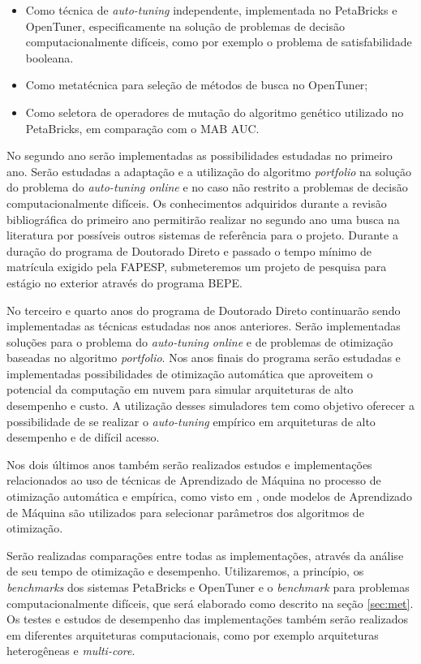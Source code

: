 \documentclass[a4paper, 12pt]{article}
\begin{document}
\begin{itemize}
    \item Como técnica de \emph{auto-tuning} independente, implementada
        no PetaBricks e OpenTuner, especificamente na solução de problemas
        de decisão computacionalmente difíceis, como por exemplo o problema
        de satisfabilidade booleana.
    \item Como metatécnica para seleção de métodos de busca no OpenTuner;
    \item Como seletora de operadores de mutação do algoritmo genético
        utilizado no PetaBricks, em comparação com o MAB AUC.
\end{itemize}

No segundo ano serão implementadas as possibilidades estudadas no primeiro ano.
Serão estudadas a adaptação e a utilização do algoritmo \emph{portfolio} na
solução do problema do \emph{auto-tuning online} e no caso não restrito a
problemas de decisão computacionalmente difíceis. Os conhecimentos adquiridos
durante a revisão bibliográfica do primeiro ano permitirão realizar no segundo
ano uma busca na literatura por possíveis outros sistemas de referência para o
projeto. Durante a duração do programa de Doutorado Direto e passado o tempo
mínimo de matrícula exigido pela FAPESP, submeteremos um projeto de pesquisa
para estágio no exterior através do programa BEPE.

No terceiro e quarto anos do programa de Doutorado Direto continuarão sendo
implementadas as técnicas estudadas nos anos anteriores. Serão implementadas
soluções para o problema do \emph{auto-tuning online} e de problemas de
otimização baseadas no algoritmo \emph{portfolio}. Nos anos finais do programa
serão estudadas e implementadas possibilidades de otimização automática
que aproveitem o potencial da computação em nuvem para simular arquiteturas
de alto desempenho e custo. A utilização desses simuladores tem como objetivo
oferecer a possibilidade de se realizar o \emph{auto-tuning} empírico em 
arquiteturas de alto desempenho e de difícil acesso.

Nos dois últimos anos também serão realizados estudos e implementações
relacionados ao uso de técnicas de Aprendizado de Máquina no processo de
otimização automática e empírica, como visto em 
\citet{lagoudakis2000reinforcement}, onde modelos de Aprendizado de Máquina
são utilizados para selecionar parâmetros dos algoritmos de otimização.

Serão realizadas comparações entre todas as implementações, através da análise
de seu tempo de otimização e desempenho. Utilizaremos, a princípio, os
\emph{benchmarks} dos sistemas PetaBricks e OpenTuner e o \emph{benchmark} para
problemas computacionalmente difíceis, que será elaborado como descrito na
seção \ref{sec:met}. Os testes e estudos de desempenho das implementações
também serão realizados em diferentes arquiteturas computacionais, como por
exemplo arquiteturas heterogêneas e \emph{multi-core}.
\end{document}
